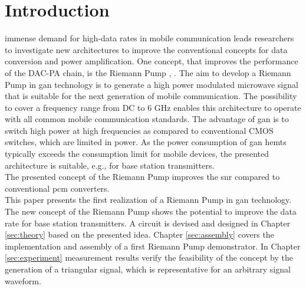 \documentclass[journal]{IEEEtran}
\begin{document}
\section{Introduction}
\label{sec:introduction}
 immense demand for high-data rates in mobile communication leads researchers to investigate new architectures to improve the conventional concepts
for data conversion and power amplification.
One concept, that improves the performance of the DAC-PA chain, is the Riemann Pump \cite{VeyracRivetDevalEtAl2014}, \cite{DevalRivetVeyrac2015}.
The aim to develop a Riemann Pump in \gls{gan} technology is to generate a high power modulated microwave signal that is suitable for the next generation of mobile communication.
The possibility to cover a frequency range from DC to 6 GHz enables this architecture to operate with all common mobile communication standards.
The advantage of \gls{gan} is to switch high power at high frequencies as compared to conventional CMOS switches, which are limited in power.
As the power consumption of \gls{gan} \glspl{hemt} typically exceeds the consumption limit for mobile devices, the presented architecture is suitable, e.g., for base station transmitters.\\
The presented concept of the Riemann Pump improves the \gls{snr} compared to conventional \gls{pcm} converters.
\\
This paper presents the first realization of a Riemann Pump in \gls{gan} technology.
The new concept of the Riemann Pump shows the potential to improve the data rate for base station transmitters.
A circuit is devised and designed in Chapter \ref{sec:theory} based on the presented idea.
Chapter \ref{sec:assembly} covers the implementation and assembly of a first Riemann Pump demonstrator.
In Chapter \ref{sec:experiment} measurement results verify the feasibility of the concept by the generation of a triangular signal, which is representative for an arbitrary signal waveform.

\end{document}
